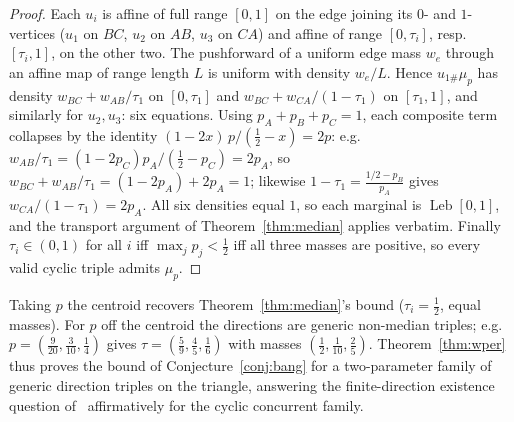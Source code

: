 \documentclass[11pt,reqno]{amsart}
\theoremstyle{plain}
\theoremstyle{definition}
\theoremstyle{remark}
\newcommand{\Leb}{\operatorname{Leb}}
\begin{document}
\begin{proof}
Each $u_i$ is affine of full range $[0,1]$ on the edge joining its $0$- and
$1$-vertices ($u_1$ on $BC$, $u_2$ on $AB$, $u_3$ on $CA$) and affine of range
$[0,\tau_i]$, resp.\ $[\tau_i,1]$, on the other two. The pushforward of a uniform
edge mass $w_e$ through an affine map of range length $L$ is uniform with density
$w_e/L$. Hence $u_{1\#}\mu_p$ has density $w_{BC}+w_{AB}/\tau_1$ on $[0,\tau_1]$ and
$w_{BC}+w_{CA}/(1-\tau_1)$ on $[\tau_1,1]$, and similarly for $u_2,u_3$: six
equations. Using $p_A+p_B+p_C=1$, each composite term collapses by the identity
$(1-2x)\,p/(\tfrac12-x)=2p$: e.g.\
$w_{AB}/\tau_1=(1-2p_C)p_A/(\tfrac12-p_C)=2p_A$, so
$w_{BC}+w_{AB}/\tau_1=(1-2p_A)+2p_A=1$; likewise
$1-\tau_1=\frac{1/2-p_B}{p_A}$ gives $w_{CA}/(1-\tau_1)=2p_A$. All six densities
equal $1$, so each marginal is $\Leb[0,1]$, and the transport argument of
Theorem~\ref{thm:median} applies verbatim. Finally $\tau_i\in(0,1)$ for all $i$ iff
$\max_jp_j<\tfrac12$ iff all three masses are positive, so every valid cyclic triple
admits $\mu_p$.
\end{proof}
Taking $p$ the centroid recovers Theorem~\ref{thm:median}'s bound ($\tau_i=\tfrac12$,
equal masses). For $p$ off the centroid the directions are generic non-median
triples; e.g.\ $p=(\tfrac9{20},\tfrac3{10},\tfrac14)$ gives
$\tau=(\tfrac59,\tfrac45,\tfrac16)$ with masses $(\tfrac12,\tfrac1{10},\tfrac25)$.
Theorem~\ref{thm:wper} thus proves the bound of Conjecture~\ref{conj:bang} for a
two-parameter family of generic direction triples on the triangle, answering the
finite-direction existence question of~\cite{Gardner88} affirmatively for the cyclic
concurrent family.
\end{document}
